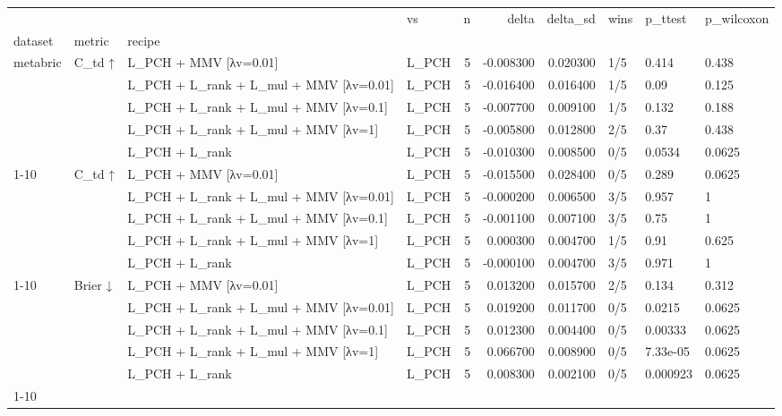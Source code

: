\begin{tabular}{llllrrrlll}
\toprule
 &  &  & vs & n & delta & delta\_sd & wins & p\_ttest & p\_wilcoxon \\
dataset & metric & recipe &  &  &  &  &  &  &  \\
\midrule
\multirow[t]{5}{*}{metabric} & \multirow[t]{5}{*}{C\_td ↑} & L\_PCH + MMV [λv=0.01] & L\_PCH & 5 & -0.008300 & 0.020300 & 1/5 & 0.414 & 0.438 \\
 &  & L\_PCH + L\_rank + L\_mul + MMV [λv=0.01] & L\_PCH & 5 & -0.016400 & 0.016400 & 1/5 & 0.09 & 0.125 \\
 &  & L\_PCH + L\_rank + L\_mul + MMV [λv=0.1] & L\_PCH & 5 & -0.007700 & 0.009100 & 1/5 & 0.132 & 0.188 \\
 &  & L\_PCH + L\_rank + L\_mul + MMV [λv=1] & L\_PCH & 5 & -0.005800 & 0.012800 & 2/5 & 0.37 & 0.438 \\
 &  & L\_PCH + L\_rank & L\_PCH & 5 & -0.010300 & 0.008500 & 0/5 & 0.0534 & 0.0625 \\
\cline{1-10} \cline{2-10}
\multirow[t]{5}{*}{support} & \multirow[t]{5}{*}{C\_td ↑} & L\_PCH + MMV [λv=0.01] & L\_PCH & 5 & -0.015500 & 0.028400 & 0/5 & 0.289 & 0.0625 \\
 &  & L\_PCH + L\_rank + L\_mul + MMV [λv=0.01] & L\_PCH & 5 & -0.000200 & 0.006500 & 3/5 & 0.957 & 1 \\
 &  & L\_PCH + L\_rank + L\_mul + MMV [λv=0.1] & L\_PCH & 5 & -0.001100 & 0.007100 & 3/5 & 0.75 & 1 \\
 &  & L\_PCH + L\_rank + L\_mul + MMV [λv=1] & L\_PCH & 5 & 0.000300 & 0.004700 & 1/5 & 0.91 & 0.625 \\
 &  & L\_PCH + L\_rank & L\_PCH & 5 & -0.000100 & 0.004700 & 3/5 & 0.971 & 1 \\
\cline{1-10} \cline{2-10}
\multirow[t]{5}{*}{metabric} & \multirow[t]{5}{*}{Brier ↓} & L\_PCH + MMV [λv=0.01] & L\_PCH & 5 & 0.013200 & 0.015700 & 2/5 & 0.134 & 0.312 \\
 &  & L\_PCH + L\_rank + L\_mul + MMV [λv=0.01] & L\_PCH & 5 & 0.019200 & 0.011700 & 0/5 & 0.0215 & 0.0625 \\
 &  & L\_PCH + L\_rank + L\_mul + MMV [λv=0.1] & L\_PCH & 5 & 0.012300 & 0.004400 & 0/5 & 0.00333 & 0.0625 \\
 &  & L\_PCH + L\_rank + L\_mul + MMV [λv=1] & L\_PCH & 5 & 0.066700 & 0.008900 & 0/5 & 7.33e-05 & 0.0625 \\
 &  & L\_PCH + L\_rank & L\_PCH & 5 & 0.008300 & 0.002100 & 0/5 & 0.000923 & 0.0625 \\
\cline{1-10} \cline{2-10}

\end{tabular}

